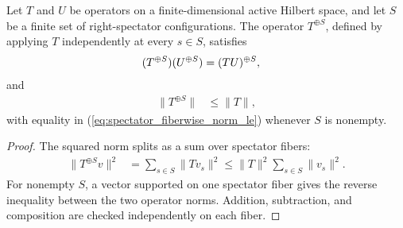\begin{lemma}
    \label{lem:right-spectator-extension}
    \leanok
    Let $T$ and $U$ be operators on a finite-dimensional active Hilbert space,
    and let $S$ be a finite set of right-spectator configurations.  The operator
    $T^{\oplus S}$, defined by applying $T$ independently at every $s\in S$,
    satisfies
    \begin{align}
        (T^{\oplus S})(U^{\oplus S}) & =(TU)^{\oplus S},
        \notag
    \end{align}
    and
    \begin{align}
        \lVert T^{\oplus S}\rVert & \leq\lVert T\rVert,
        \label{eq:spectator_fiberwise_norm_le}
    \end{align}
    with equality in (\ref{eq:spectator_fiberwise_norm_le}) whenever $S$ is nonempty.
\end{lemma}

\begin{proof}
    \leanok
    The squared norm splits as a sum over spectator fibers:
    \begin{align}
        \lVert T^{\oplus S}v\rVert^2
         & =\sum_{s\in S}\lVert Tv_s\rVert^2
        \leq\lVert T\rVert^2\sum_{s\in S}\lVert v_s\rVert^2.
    \end{align}
    For nonempty $S$, a vector supported on one spectator fiber gives the
    reverse inequality between the two operator norms.  Addition, subtraction,
    and composition are checked independently on each fiber.
\end{proof}

